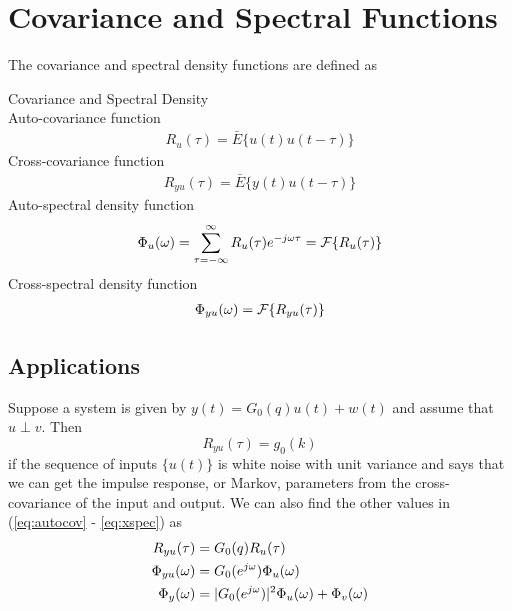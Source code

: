 
\mainmatter
\setcounter{page}{1}

\lectureseries[\course]{\course}

\date{October 8, 2009}

\setaddress

\setcounter{lecture}{4}
\setcounter{chapter}{4}


\section{Covariance and Spectral Functions}
The covariance and spectral density functions are defined as
\begin{definition}{Covariance and Spectral Density} \\
Auto-covariance function
\begin{align}
\label{eq:autocov}
R_u(\tau) = \bar{E}\{u(t)u(t-\tau)\}
\end{align}
Cross-covariance function
\begin{align}
\label{eq:xcov}
R_{yu}(\tau) = \bar{E}\{y(t)u(t-\tau)\}
\end{align}
Auto-spectral density function
\begin{align}
\label{eq:autospec}
\Phi_u(\omega) = \sum_{\tau=-\infty}^\infty R_u(\tau)e^{-j\omega\tau} = \mathcal{F}\{R_u(\tau)\}
\end{align}
Cross-spectral density function
\begin{align}
\label{eq:xspec}
\Phi_{yu}(\omega) = \mathcal{F}\{R_{yu}(\tau)\}
\end{align}
\end{definition}

\subsection{Applications}
Suppose a system is given by $y(t) = G_0(q)u(t)+w(t)$ and assume that $u\perp v$. Then
$$R_{yu}(\tau) = g_0(k)$$
if the sequence of inputs $\{u(t)\}$ is white noise with unit variance and says that we can get the impulse response, or Markov, parameters from the cross-covariance of the input and output. We can also find the other values in (\ref{eq:autocov} - \ref{eq:xspec}) as
\begin{align*}
R_{yu}(\tau) &= G_0(q)R_u(\tau) \\
\Phi_{yu}(\omega) &= G_0(e^{j\omega})\Phi_u(\omega) \\
\Phi_y(\omega) &= |G_0(e^{j\omega})|^2\Phi_u(\omega) + \Phi_v(\omega)
\end{align*}

